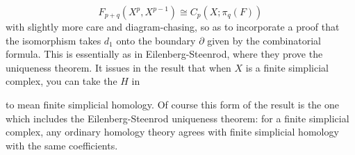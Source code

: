 \documentclass[../main]{subfiles}
\begin{document}
\begin{enumerate}[label=(\roman*)]
    \begin{equation*}
        F_{p+q}(X^p,X^{p-1})\cong C_p(X;\pi_q(F))
    \end{equation*}
    with slightly more care and diagram-chasing, so as to incorporate a proof that the isomorphism takes $d_1$ onto the boundary $\partial$ given by the combinatorial formula. This is essentially as in Eilenberg-Steenrod, where they prove the uniqueness theorem. It issues in the result that when $X$ is a finite simplicial complex, you can take the $H$ in 
    \begin{center}
    \end{center}
    to mean finite simplicial homology. Of course this form of the result is the one which includes the Eilenberg-Steenrod uniqueness theorem: for a finite simplicial complex, any ordinary homology theory agrees with finite simplicial homology with the same coefficients.
\end{enumerate}
\end{document}
